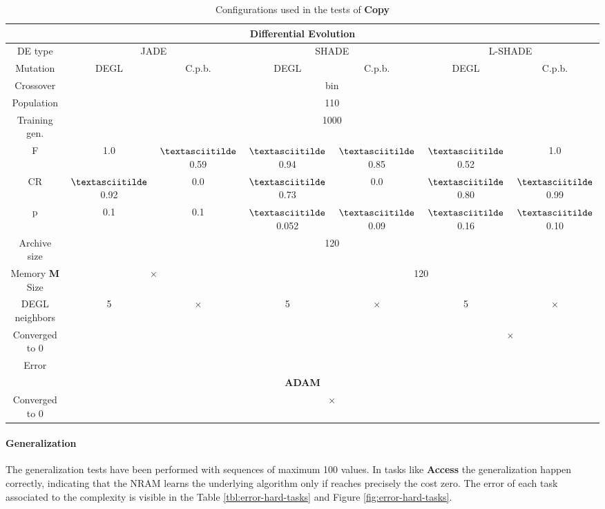 \begin{table}[!h]
\begin{tabular}{|c|c|c|c|c|c|c|}
		\multicolumn{7}{|c|}{\textbf{Differential Evolution}} \\ \hline
		DE type & \multicolumn{2}{c|}{JADE} & \multicolumn{2}{c|}{SHADE} & \multicolumn{2}{c|}{L-SHADE}  \\ \hline
		Mutation & DEGL & C.p.b. & DEGL & C.p.b. & DEGL & C.p.b. \\ \hline
		Crossover & \multicolumn{6}{c|}{bin} \\ \hline
		Population & \multicolumn{6}{c|}{110} \\ \hline
		Training gen. & \multicolumn{6}{c|}{1000} \\ \hline
		F & 1.0 & $\textasciitilde$0.59 & $\textasciitilde$0.94 & $\textasciitilde$0.85 & $\textasciitilde$0.52 & 1.0 \\ \hline
		CR & $\textasciitilde$0.92 & 0.0 & $\textasciitilde$0.73 & 0.0 & $\textasciitilde$0.80 & $\textasciitilde$0.99 \\ \hline
		p & 0.1 & 0.1 & $\textasciitilde$0.052 & $\textasciitilde$0.09 & $\textasciitilde$0.16 & $\textasciitilde$0.10 \\ \hline
		Archive size & \multicolumn{6}{c|}{120} \\ \hline
		Memory \textbf{M} Size & \multicolumn{2}{c|}{$\times$} & \multicolumn{4}{|c|}{120} \\ \hline
		DEGL neighbors & 5 & $\times$ & 5 & $\times$ & 5 & $\times$  \\ \hline
		Converged to 0 & \multicolumn{4}{|c|}{\checkmark} & \multicolumn{2}{c|}{$\times$} \\ \hline
		Error & & & & & & \\ \hline\hline
		
		\multicolumn{7}{|c|}{\textbf{ADAM}} \\ \hline
		Converged to 0 & \multicolumn{6}{|c|}{$\times$} \\ \hline
 	\end{tabular}
	\caption{Configurations used in the tests of \textbf{Copy}}
	\label{tbl:tests-configurations-copy}
\end{table}

\paragraph{Generalization}
The generalization tests have been performed with sequences of maximum 100 values. In tasks like \textbf{Access} the generalization happen correctly, indicating that the NRAM learns the underlying algorithm only if reaches precisely the cost zero. The error of each task associated to the complexity is visible in the Table \ref{tbl:error-hard-tasks} and Figure \ref{fig:error-hard-tasks}.


